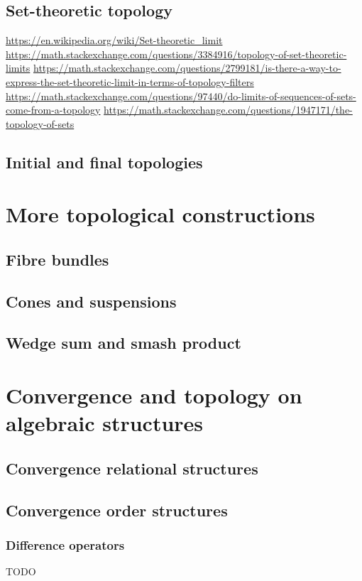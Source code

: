 \section{Set-theoretic topology}
\url{https://en.wikipedia.org/wiki/Set-theoretic_limit}
\url{https://math.stackexchange.com/questions/3384916/topology-of-set-theoretic-limits}
\url{https://math.stackexchange.com/questions/2799181/is-there-a-way-to-express-the-set-theoretic-limit-in-terms-of-topology-filters}
\url{https://math.stackexchange.com/questions/97440/do-limits-of-sequences-of-sets-come-from-a-topology}
\url{https://math.stackexchange.com/questions/1947171/the-topology-of-sets}

\section{Initial and final topologies}

\chapter{More topological constructions}
\section{Fibre bundles}
\section{Cones and suspensions}
\section{Wedge sum and smash product}

\chapter{Convergence and topology on algebraic structures}
\section{Convergence relational structures}
\section{Convergence order structures}
\subsection{Difference operators}
TODO

